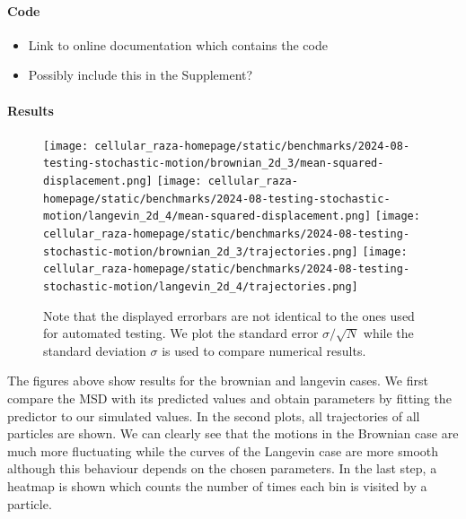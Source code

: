 \documentclass[a4paper]{article}
\begin{document}
\paragraph{Code}
\begin{itemize}
    \item Link to online documentation which contains the code
    \item Possibly include this in the Supplement?
\end{itemize}

\paragraph{Results}

\begin{figure}
    \centering
    \texttt{[image: cellular\_raza-homepage/static/benchmarks/2024-08-testing-stochastic-motion/brownian\_2d\_3/mean-squared-displacement.png]}
    \texttt{[image: cellular\_raza-homepage/static/benchmarks/2024-08-testing-stochastic-motion/langevin\_2d\_4/mean-squared-displacement.png]}
    \texttt{[image: cellular\_raza-homepage/static/benchmarks/2024-08-testing-stochastic-motion/brownian\_2d\_3/trajectories.png]}
    \texttt{[image: cellular\_raza-homepage/static/benchmarks/2024-08-testing-stochastic-motion/langevin\_2d\_4/trajectories.png]}
    \caption{
        Note that the displayed errorbars are not identical to the ones used for automated testing.
        We plot the standard error $\sigma / \sqrt{N}$ while the standard deviation $\sigma$ is used
        to compare numerical results.
    }
\end{figure}

The figures above show results for the brownian and langevin cases.
We first compare the MSD with its predicted values and obtain parameters by fitting the predictor
to our simulated values.
In the second plots, all trajectories of all particles are shown.
We can clearly see that the motions in the Brownian case are much more fluctuating while the curves
of the Langevin case are more smooth although this behaviour depends on the chosen parameters.
In the last step, a heatmap is shown which counts the number of times each bin is visited by a
particle.
\end{document}
